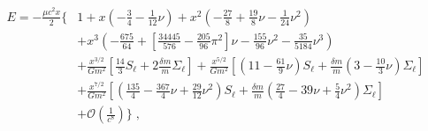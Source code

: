 \begin{align}
\label{Eofx}
E=-\frac{\mu c^2 x}{2}\Bigg\{ &
1
+x \left(-\frac{3}{4} -\frac{1}{12} \nu\right)
+x^2 \left(-\frac{27}{8} + \frac{19}{8} \nu -\frac{1}{24} \nu^2\right)\nonumber\\
&+x^3 \left( -\frac{675}{64}+\left[\frac{34445}{576}-\frac{205}{96}\pi^2\right]\nu-\frac{155}{96}\nu^2-\frac{35}{5184}\nu^3\right) \nonumber\\
&+\frac{x^{3/2}}{G m^2}\left[\frac{14}{3}S_\ell+2\frac{\delta m}{m}\Sigma _\ell\right]
+\frac{x^{5/2}}{G m^2} \left[\left(11 -\frac{61}{9} \nu\right)S_\ell+\frac{\delta m}{m}\left(3 -\frac{10}{3} \nu\right)\Sigma _\ell\right]\nonumber\\
&+\frac{x^{7/2}}{G m^2} \left[\left(\frac{135}{4} -\frac{367}{4} \nu + \frac{29}{12} \nu^2\right)S_\ell+\frac{\delta m}{m}\left(\frac{27}{4} -39 \nu + \frac{5}{4} \nu^2\right)\Sigma _\ell\right]\nonumber\\
&+\mathcal{O}\left(\frac{1}{c^8}\right)
\Bigg\} \;,
\end{align}